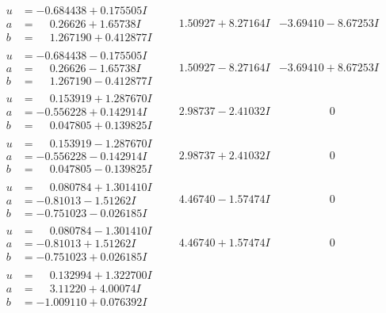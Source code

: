 \documentclass[1p]{elsarticle_modified}
\theoremstyle{definition}
\begin{document}
$$\begin{array}{c|c|c}
\begin{aligned}
u &= -0.684438 + 0.175505 I \\
a &= \phantom{-}0.26626 + 1.65738 I \\
b &= \phantom{-}1.267190 + 0.412877 I\end{aligned}
 & \phantom{-}1.50927 + 8.27164 I & -3.69410 - 8.67253 I \\ \hline\begin{aligned}
u &= -0.684438 - 0.175505 I \\
a &= \phantom{-}0.26626 - 1.65738 I \\
b &= \phantom{-}1.267190 - 0.412877 I\end{aligned}
 & \phantom{-}1.50927 - 8.27164 I & -3.69410 + 8.67253 I \\ \hline\begin{aligned}
u &= \phantom{-}0.153919 + 1.287670 I \\
a &= -0.556228 + 0.142914 I \\
b &= \phantom{-}0.047805 + 0.139825 I\end{aligned}
 & \phantom{-}2.98737 - 2.41032 I & \phantom{-0.000000 } 0 \\ \hline\begin{aligned}
u &= \phantom{-}0.153919 - 1.287670 I \\
a &= -0.556228 - 0.142914 I \\
b &= \phantom{-}0.047805 - 0.139825 I\end{aligned}
 & \phantom{-}2.98737 + 2.41032 I & \phantom{-0.000000 } 0 \\ \hline\begin{aligned}
u &= \phantom{-}0.080784 + 1.301410 I \\
a &= -0.81013 - 1.51262 I \\
b &= -0.751023 - 0.026185 I\end{aligned}
 & \phantom{-}4.46740 - 1.57474 I & \phantom{-0.000000 } 0 \\ \hline\begin{aligned}
u &= \phantom{-}0.080784 - 1.301410 I \\
a &= -0.81013 + 1.51262 I \\
b &= -0.751023 + 0.026185 I\end{aligned}
 & \phantom{-}4.46740 + 1.57474 I & \phantom{-0.000000 } 0 \\ \hline\begin{aligned}
u &= \phantom{-}0.132994 + 1.322700 I \\
a &= \phantom{-}3.11220 + 4.00074 I \\
b &= -1.009110 + 0.076392 I\end{aligned}

\end{array}$$
\end{document}
